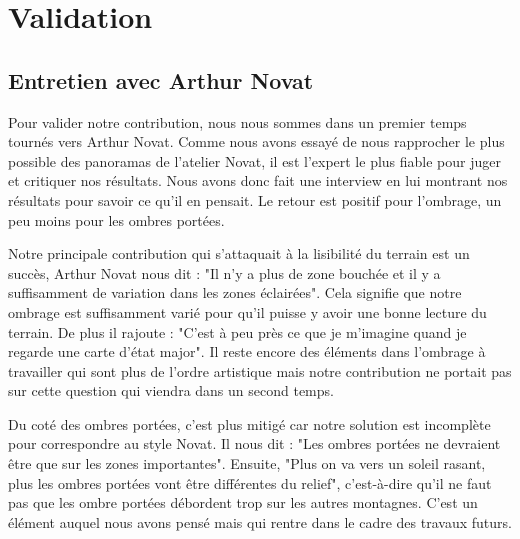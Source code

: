 \chapter{Validation}


\section{Entretien avec Arthur Novat}
Pour valider notre contribution, nous nous sommes dans un premier temps tournés vers Arthur Novat. Comme nous avons essayé de nous rapprocher le plus possible des panoramas de l'atelier Novat, il est l'expert le plus fiable pour juger et critiquer nos résultats. Nous avons donc fait une interview en lui montrant nos résultats pour savoir ce qu'il en pensait. Le retour est positif pour l'ombrage, un peu moins pour les ombres portées. 

Notre principale contribution qui s’attaquait à la lisibilité du terrain est un succès, Arthur Novat nous dit : "Il n'y a plus de zone bouchée et il y a suffisamment de variation dans les zones éclairées". Cela signifie que notre ombrage est suffisamment varié pour qu'il puisse y avoir une bonne lecture du terrain. De plus il rajoute : "C'est à peu près ce que je m'imagine quand je regarde une carte d'état major". Il reste encore des éléments dans l’ombrage à travailler qui sont plus de l'ordre artistique mais notre contribution ne portait pas sur cette question qui viendra dans un second temps.  



Du coté des ombres portées, c'est plus mitigé car notre solution est incomplète pour correspondre au style Novat. Il nous dit : "Les ombres portées ne devraient être que sur les zones importantes". Ensuite, "Plus on va vers un soleil rasant, plus les ombres portées vont être différentes du relief", c'est-à-dire qu'il ne faut pas que les ombre portées débordent trop sur les autres montagnes. C'est un élément auquel nous avons pensé mais qui rentre dans le cadre des travaux futurs.


